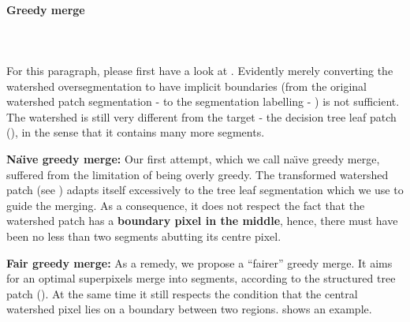 \paragraph{Greedy merge}\mbox{}\\\mbox{}\\ %
For this paragraph, please first have a look at . Evidently merely converting the watershed oversegmentation to have implicit boundaries (from the original watershed patch segmentation -  to the segmentation labelling - ) is not sufficient. The watershed is still very different from the target - the decision tree leaf patch (), in the sense that it contains many more segments.

\textbf{Na\"{\i}ve greedy merge:} Our first attempt, which we call na\"{\i}ve greedy merge, suffered from the limitation of being overly 
greedy. The transformed watershed patch (see ) adapts itself excessively to the tree leaf segmentation which we use to guide the merging. As a consequence, it does not respect the fact that the watershed patch has a \textbf{boundary pixel in the middle}, hence, there must have been no less than two segments abutting its centre pixel.

\textbf{Fair greedy merge:} As a remedy, we propose a ``fairer'' greedy merge. It %
aims for an optimal superpixels merge into segments, according to the structured tree patch (). At the same time it still respects the condition that the central watershed pixel lies on a boundary between two regions.  shows an example.

